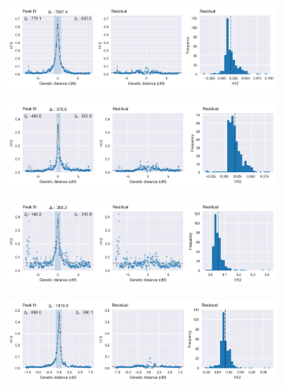 \begin{refsection}
\begin{figure}[t!]
    \centering
    \begin{subfigure}[t]{0.32\textwidth}
        \centering
        \caption{}
        \includegraphics[width=1.1\textwidth,center,trim=0 27 380 0, clip]{artwork/chapter5/peak_fit_h12_cyp6p_ugs.png}
    \end{subfigure}
    \hfill
    \begin{subfigure}[t]{0.32\textwidth}
        \centering
        \caption{}
        \includegraphics[width=1.1\textwidth,center,trim=0 27 380 0, clip]{artwork/chapter5/peak_fit_h12_cyp6p_bfs.png}
    \end{subfigure}
    \hfill
    \begin{subfigure}[t]{0.32\textwidth}
        \centering
        \caption{}
        \includegraphics[width=1.1\textwidth,center,trim=0 27 380 0, clip]{artwork/chapter5/peak_fit_h12_cyp6p_bfm.png}
    \end{subfigure}
    \vspace{0cm}
    \begin{subfigure}[t]{0.32\textwidth}
        \centering
        \caption{}
        \includegraphics[width=1.1\textwidth,center,trim=0 27 380 0, clip]{artwork/chapter5/peak_fit_h12_gste_cms.png}

\end{subfigure}
\end{figure}
\end{refsection}

